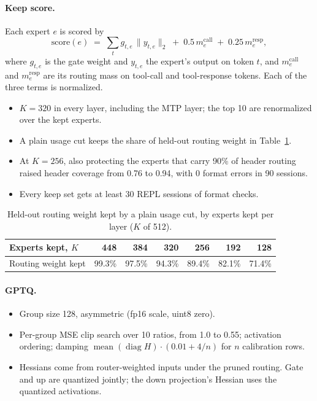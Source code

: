 \documentclass[10pt]{article}
\begin{document}
\paragraph{Keep score.} Each expert $e$ is scored by
\begin{equation*}
  \mathrm{score}(e) \;=\; \sum_{t} g_{t,e}\,\lVert y_{t,e}\rVert_2 \;+\; 0.5\, m^{\mathrm{call}}_{e} \;+\; 0.25\, m^{\mathrm{resp}}_{e},
\end{equation*}
where $g_{t,e}$ is the gate weight and $y_{t,e}$ the expert's output on token $t$, and $m^{\mathrm{call}}_{e}$ and
$m^{\mathrm{resp}}_{e}$ are its routing mass on tool-call and tool-response tokens. Each of the three terms is normalized.
\begin{itemize}
  \item $K = 320$ in every layer, including the MTP layer; the top 10 are renormalized over the kept experts.
  \item A plain usage cut keeps the share of held-out routing weight in Table~\ref{tab:coverage}.
  \item At $K = 256$, also protecting the experts that carry 90\% of header routing raised header coverage from 0.76
        to 0.94, with 0 format errors in 90 sessions.
  \item Every keep set gets at least 30 REPL sessions of format checks.
\end{itemize}

\begin{table}[H]
  \centering\small
  \caption{Held-out routing weight kept by a plain usage cut, by experts kept per layer ($K$ of 512).}
  \label{tab:coverage}
  \begin{tabular}{@{}lrrrrrr@{}}
    \toprule
    Experts kept, $K$ & 448 & 384 & 320 & 256 & 192 & 128 \\
    \midrule
    Routing weight kept & 99.3\% & 97.5\% & 94.3\% & 89.4\% & 82.1\% & 71.4\% \\
    \bottomrule
  \end{tabular}
\end{table}

\paragraph{GPTQ.}
\begin{itemize}
  \item Group size 128, asymmetric (fp16 scale, uint8 zero).
  \item Per-group MSE clip search over 10 ratios, from 1.0 to 0.55; activation ordering; damping
        $\operatorname{mean}(\operatorname{diag} H)\cdot(0.01 + 4/n)$ for $n$ calibration rows.
  \item Hessians come from router-weighted inputs under the pruned routing. Gate and up are quantized jointly; the
        down projection's Hessian uses the quantized activations.
\end{itemize}
\end{document}
